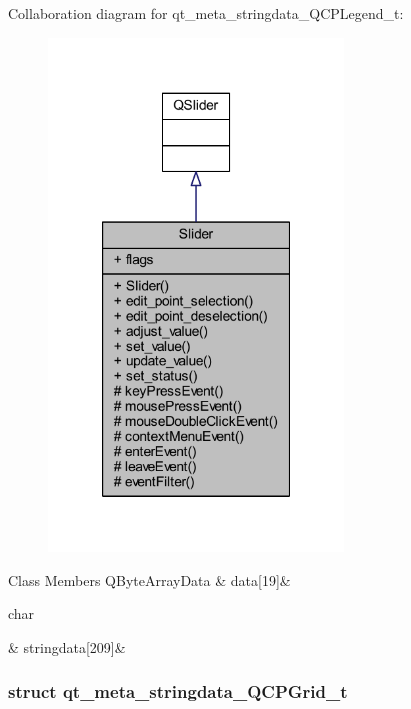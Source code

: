 Collaboration diagram for qt\+\_\+meta\+\_\+stringdata\+\_\+\+Q\+C\+P\+Legend\+\_\+t\+:
\nopagebreak
\begin{figure}[H]
\begin{center}
\leavevmode
\includegraphics[width=222pt]{d0/da2/a00307}
\end{center}
\end{figure}
\begin{DoxyFields}{Class Members}
\hypertarget{a00067_abb2a7af4ffa957bddb891b5663c0aa55}{Q\+Byte\+Array\+Data}\label{a00067_abb2a7af4ffa957bddb891b5663c0aa55}
&
data\mbox{[}19\mbox{]}&
\\
\hline

\hypertarget{a00067_a26b79395b8d9f94641f81b197841ede1}{char}\label{a00067_a26b79395b8d9f94641f81b197841ede1}
&
stringdata\mbox{[}209\mbox{]}&
\\
\hline

\end{DoxyFields}
\label{de/db1/a00197}
\hypertarget{a00067_de/db1/a00197}{}
\subsubsection{struct qt\+\_\+meta\+\_\+stringdata\+\_\+\+Q\+C\+P\+Grid\+\_\+t}


